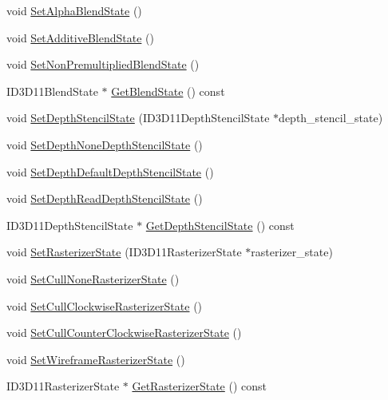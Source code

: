 \begin{DoxyCompactItemize}
void \hyperlink{structmage_1_1_rendering_state_a7f97752f22b0a32912f24d16c1aa2441}{Set\+Alpha\+Blend\+State} ()
\item 
void \hyperlink{structmage_1_1_rendering_state_a61341d0fc7f1140faaf8fb33f9bb13fb}{Set\+Additive\+Blend\+State} ()
\item 
void \hyperlink{structmage_1_1_rendering_state_acf313a797964e3a86dde2799a42f2db3}{Set\+Non\+Premultiplied\+Blend\+State} ()
\item 
I\+D3\+D11\+Blend\+State $\ast$ \hyperlink{structmage_1_1_rendering_state_a72fec4a686de92afdb32a38907fb8e00}{Get\+Blend\+State} () const
\item 
void \hyperlink{structmage_1_1_rendering_state_abd2c63744e29e526e145bcacb3e07867}{Set\+Depth\+Stencil\+State} (I\+D3\+D11\+Depth\+Stencil\+State $\ast$depth\+\_\+stencil\+\_\+state)
\item 
void \hyperlink{structmage_1_1_rendering_state_a67db088d08560ab5f3adde28032972a4}{Set\+Depth\+None\+Depth\+Stencil\+State} ()
\item 
void \hyperlink{structmage_1_1_rendering_state_a88933420c94d4127973d8148ccd97e86}{Set\+Depth\+Default\+Depth\+Stencil\+State} ()
\item 
void \hyperlink{structmage_1_1_rendering_state_a86ff2bb5739ada7ffcc275f4624d2a24}{Set\+Depth\+Read\+Depth\+Stencil\+State} ()
\item 
I\+D3\+D11\+Depth\+Stencil\+State $\ast$ \hyperlink{structmage_1_1_rendering_state_aefe2d1e5e2b2f5b3043724eed3c9ea44}{Get\+Depth\+Stencil\+State} () const
\item 
void \hyperlink{structmage_1_1_rendering_state_a067596b397a607f5016b2f8ef9e7dd2e}{Set\+Rasterizer\+State} (I\+D3\+D11\+Rasterizer\+State $\ast$rasterizer\+\_\+state)
\item 
void \hyperlink{structmage_1_1_rendering_state_a4841e36e7be34f949da1d4088f217a1a}{Set\+Cull\+None\+Rasterizer\+State} ()
\item 
void \hyperlink{structmage_1_1_rendering_state_a707034239265916d82e7dbe168f09cb6}{Set\+Cull\+Clockwise\+Rasterizer\+State} ()
\item 
void \hyperlink{structmage_1_1_rendering_state_aa66215168ce8752ef20065b161bad1fc}{Set\+Cull\+Counter\+Clockwise\+Rasterizer\+State} ()
\item 
void \hyperlink{structmage_1_1_rendering_state_a392b339b24950c71bfc7285bcca5eacf}{Set\+Wireframe\+Rasterizer\+State} ()
\item 
I\+D3\+D11\+Rasterizer\+State $\ast$ \hyperlink{structmage_1_1_rendering_state_ac7d1a6360ebd65b9345f9f4e38262fe7}{Get\+Rasterizer\+State} () const

\end{DoxyCompactItemize}
